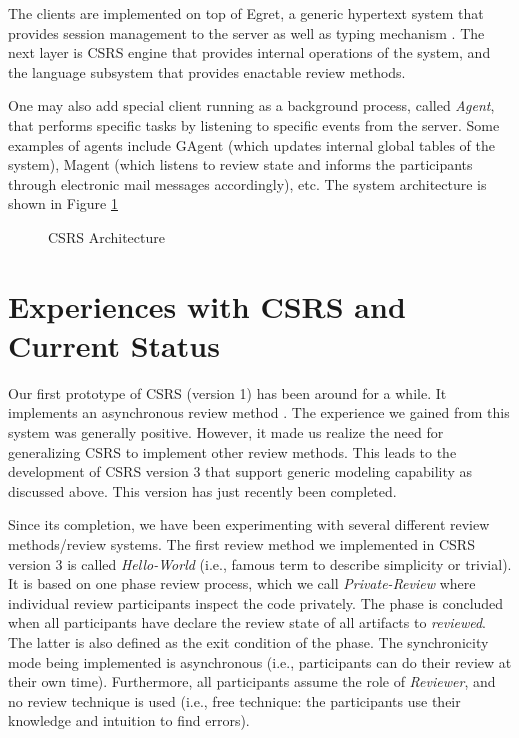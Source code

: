 The clients are implemented on top of Egret, a generic hypertext system
that provides session management to the server as well as typing
mechanism \cite{csdl-92-01,csdl-93-09}. The next layer is CSRS engine
that provides internal 
operations of the system, and the language subsystem that provides
enactable review methods.

One may also add special client running as a background process,
called {\it Agent}, that performs specific 
tasks by listening to specific events from the server.
Some examples of agents include GAgent (which updates internal global
tables of the system), Magent (which listens to review state
and informs the participants through electronic mail messages
accordingly), etc.  
The system architecture is shown in Figure \ref{fig:csrs-architecture}

\begin{figure}[h]
  \begin{center}
  \end{center}
  \caption{CSRS Architecture}
  \label{fig:csrs-architecture}
\end{figure}


\section{Experiences with CSRS and Current Status}

Our first prototype of CSRS (version 1)
has been around for a while. It implements an asynchronous review
method \cite{Johnson93}. 
The experience we gained from this system was generally positive.
However, it made us realize the need
for generalizing CSRS to implement other review methods.  
This leads to the development of CSRS version 3 that support generic
modeling capability as discussed above. This version has just recently
been completed. 

Since its completion, we have been experimenting with several different
review methods/review systems. The first review method we implemented
in CSRS version 3 is called {\it Hello-World} (i.e., famous term to 
describe simplicity or trivial). It is based on
one phase review process, which we call {\it Private-Review}
where individual review participants inspect the code privately. The
phase is concluded when all participants have declare the review state
of all artifacts to {\it reviewed}. The latter is also defined as the exit
condition of the phase. The 
synchronicity mode being implemented is asynchronous (i.e.,
participants can do their 
review at their own time). Furthermore, all participants assume the
role of {\it Reviewer}, and no review technique is used (i.e.,
free technique: the participants use their knowledge and intuition to
find errors). 

